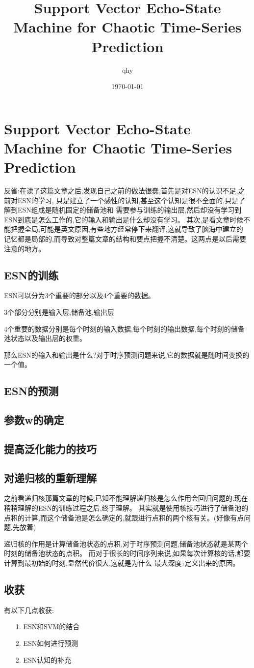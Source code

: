 \documentclass[UTF8,a4paper]{ctexart}
\author{qhy}
\title{Support Vector Echo-State Machine for Chaotic Time-Series Prediction}
\date{\today}
\begin{document}
  \maketitle
  \tableofcontents
  \newpage
  \section{Support Vector Echo-State Machine for Chaotic Time-Series Prediction}
  反省:在读了这篇文章之后,发现自己之前的做法很蠢,首先是对ESN的认识不足,之前对ESN的学习,
  只是建立了一个感性的认知,甚至这个认知是很不全面的,只是了解到ESN组成是随机固定的储备池和
  需要参与训练的输出层,然后却没有学习到ESN到底是怎么工作的,它的输入和输出是什么却没有学习。
  其次,是看文章时候不能把握全局,可能是英文原因,有些地方经常停下来翻译,这就导致了脑海中建立的
  记忆都是局部的,而导致对整篇文章的结构和要点把握不清楚。这两点是以后需要注意的地方。

  \subsection{ESN的训练}
  ESN可以分为3个重要的部分以及4个重要的数据。

  3个部分分别是输入层,储备池,输出层

  4个重要的数据分别是每个时刻的输入数据,每个时刻的输出数据,每个时刻的储备池状态以及输出层的权重。

  那么ESN的输入和输出是什么?对于时序预测问题来说,它的数据就是随时间变换的一个值。

  \subsection{ESN的预测}

  \subsection{参数w的确定}

  \subsection{提高泛化能力的技巧}

  \subsection{对递归核的重新理解}
  之前看递归核那篇文章的时候,已知不能理解递归核是怎么作用会回归问题的,现在稍稍理解的ESN的训练过程之后,终于理解。
  其实就是使用核技巧进行了储备池的点积的计算,而这个储备池是怎么确定的,就跟进行点积的两个核有关。(好像有点问题,先放着)

  递归核的作用是计算储备池状态的点积,对于时序预测问题,储备池状态就是某两个时刻的储备池状态的点积。
  而对于很长的时间序列来说,如果每次计算核的话,都要计算到最初始的时刻,显然代价很大,这就是为什么
  最大深度$\tau$定义出来的原因。



  \subsection{收获}
  有以下几点收获:
  \begin{itemize}
    \item [1.] ESN和SVM的结合
    \item [2.] ESN如何进行预测
    \item [2.] ESN认知的补充
  \end{itemize}
\end{document}
